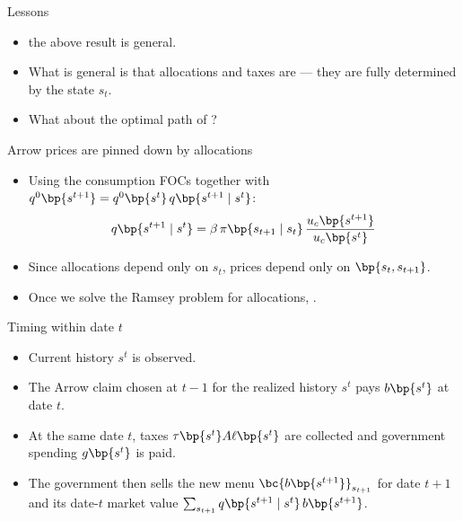\documentclass[11pt,xcolor={dvipsnames},aspectratio=159,hyperref={pdftex,pdfpagemode=UseNone,hidelinks,pdfdisplaydoctitle=true},usepdftitle=false]{beamer}
\begin{document}
            \begin{frame}{Lessons}
                \begin{itemize}
                \item {} the above result is  general.
                \item What is general is that allocations and taxes are  --- they are fully determined by the  state $s_t$.
                \item What about the optimal path of ?
                \end{itemize}
            \end{frame}

            \begin{frame}{Arrow prices are pinned down by allocations}
                \begin{itemize}
                \item Using the consumption FOCs together with $q^0\bp{s^{t+1}} = q^0\bp{s^t}\,q\bp{s^{t+1}\mid s^t}$:
                \begin{align*}
                    q\bp{s^{t+1} \mid s^t} = \beta\,\pi\bp{s_{t+1} \mid s_t}\,\frac{u_c\bp{s^{t+1}}}{u_c\bp{s^t}}
                \end{align*}
                \item Since allocations depend only on $s_t$, prices depend only on $\bp{s_t, s_{t+1}}$.
                \item Once we solve the Ramsey problem for allocations, .
                \end{itemize}
            \end{frame}

            \begin{frame}{Timing within date $t$}
                \begin{itemize}
                \item Current history $s^t$ is observed.
                \item The Arrow claim chosen at $t-1$ for the realized history $s^t$ pays $b\bp{s^t}$ at date $t$.
                \item At the same date $t$, taxes $\tau\bp{s^t}A\ell\bp{s^t}$ are collected and government spending $g\bp{s^t}$ is paid.
                \item The government then sells the new menu $\bc{b\bp{s^{t+1}}}_{s_{t+1}}$ for date $t+1$ and  its date-$t$ market value $\sum_{s_{t+1}} q\bp{s^{t+1}\mid s^t}\, b\bp{s^{t+1}}$.
                \end{itemize}
            \end{frame}
\end{document}
